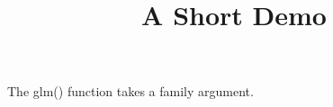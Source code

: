 \documentclass[article]{jss}
\title{A Short Demo}
\begin{document}
The glm() function takes a family argument.
\end{document}
